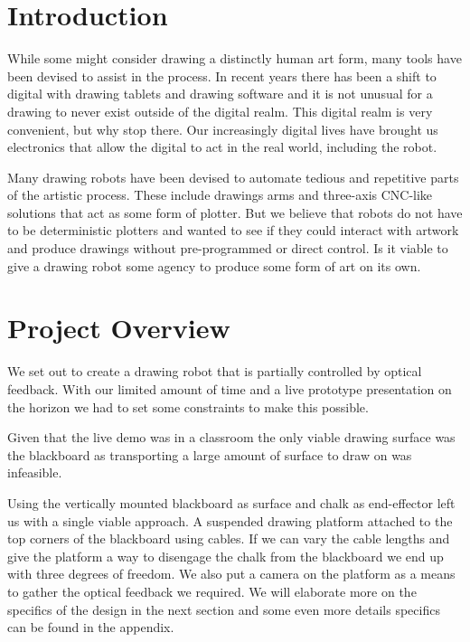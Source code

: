 \documentclass[12pt]{article}
\begin{document}
\section{Introduction}
\label{sec:intro}

While some might consider drawing a distinctly human art form,
many tools have been devised to assist in the process.
In recent years there has been a shift to digital with drawing
tablets and drawing software and it is not unusual for a drawing
to never exist outside of the digital realm.
This digital realm is very convenient, but why stop there.
Our increasingly digital lives have brought us electronics that
allow the digital to act in the real world, including the robot.

Many drawing robots have been devised to automate tedious and
repetitive parts of the artistic process.
These include drawings arms and three-axis CNC-like solutions that
act as some form of plotter.
But we believe that robots do not have to be deterministic plotters
and wanted to see if they could interact with artwork and produce
drawings without pre-programmed or direct control.
Is it viable to give a drawing robot some agency to produce some
form of art on its own.

\section{Project Overview}
\label{sec:overview}

We set out to create a drawing robot that is partially controlled by
optical feedback.
With our limited amount of time and a live prototype presentation
on the horizon we had to set some constraints to make this possible.

Given that the live demo was in a classroom the only viable drawing
surface was the blackboard as transporting a large amount of surface
to draw on was infeasible.

Using the vertically mounted blackboard as surface and chalk as
end-effector left us with a single viable approach.
A suspended drawing platform attached to the top corners of the
blackboard using cables.
If we can vary the cable lengths and give the platform a way to
disengage the chalk from the blackboard we end up with three
degrees of freedom.
We also put a camera on the platform as a means to gather the
optical feedback we required.
We will elaborate more on the specifics of the design in the next
section and some even more details specifics can be found in the
appendix.
\end{document}
